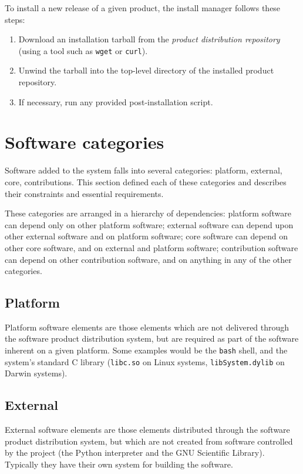 \documentclass[draftmode,draftwater]{memarticle}
\newcommand{\prog}[1]%
  {\texttt{#1}}
\begin{document}
To install a new release of a given product, the install manager follows
these steps:
\begin{enumerate}
\item Download an installation tarball from the \emph{product distribution
  repository} (using a tool such as \prog{wget} or \prog{curl}).
\item Unwind the tarball into the top-level directory of the installed
  product repository.
\item If necessary, run any provided post-installation script.
\end{enumerate}

\section{Software categories}

Software added to the system falls into several categories: platform,
external, core, contributions. This section defined each of these
categories and describes their constraints and essential requirements.

These categories are arranged in a hierarchy of dependencies: platform
software can depend only on other platform software; external software
can depend upon other external software and on platform software; core
software can depend on other core software, and on external and platform
software; contribution software can depend on other contribution
software, and on anything in any of the other categories.

\subsection{Platform}

Platform software elements are those elements which are not delivered
through the software product distribution system, but are required as
part of the software inherent on a given platform. Some examples would
be the \prog{bash} shell, and the system's standard C library
(\prog{libc.so} on Linux systems, \prog{libSystem.dylib} on Darwin
systems).

\subsection{External}

External software elements are those elements distributed through the
software product distribution system, but which are not created from
software controlled by the project (\eg the Python interpreter and the
GNU Scientific Library). Typically they have their own system for
building the software.
\end{document}
